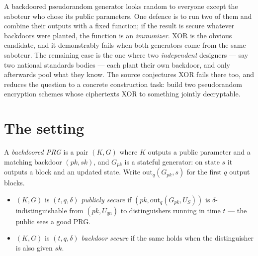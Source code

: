 \documentclass{aicr-conjecture}
\newcommand{\out}{\mathrm{out}}
\begin{document}

\vspace{0.4em}

\begin{informalconjecture}
A backdoored pseudorandom generator looks random to everyone except the
saboteur who chose its public parameters. One defence is to run two of
them and combine their outputs with a fixed function; if the result is
secure whatever backdoors were planted, the function is an
\emph{immunizer}. XOR is the obvious candidate, and it demonstrably fails
when both generators come from the same saboteur. The remaining case is
the one where two \emph{independent} designers --- say two national
standards bodies --- each plant their own backdoor, and only afterwards
pool what they know. The source conjectures XOR fails there too, and
reduces the question to a concrete construction task: build two
pseudorandom encryption schemes whose ciphertexts XOR to something
jointly decryptable.
\end{informalconjecture}

\section{The setting}\label{sec:setting}

A \emph{backdoored PRG} is a pair $(K, G)$ where $K$ outputs a public
parameter and a matching backdoor $(pk, sk)$, and $G_{pk}$ is a stateful
generator: on state $s$ it outputs a block and an updated state. Write
$\out_q(G_{pk}, s)$ for the first $q$ output blocks.

\begin{itemize}[nosep]
  \item $(K,G)$ is \emph{$(t,q,\delta)$ publicly secure} if
    $(pk, \out_q(G_{pk}, U_S))$ is $\delta$-indistinguishable from
    $(pk, U_{qn})$ to distinguishers running in time $t$ --- the public
    sees a good PRG\@.
  \item $(K,G)$ is \emph{$(t,q,\delta)$ backdoor secure} if the same holds
    when the distinguisher is also given $sk$.
\end{itemize}
\end{document}
